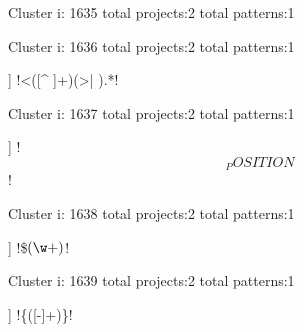 Cluster i: 1635
total projects:2
total patterns:1
\begin{multicols}{1}
\end{multicols}







Cluster i: 1636
total projects:2
total patterns:1
\begin{multicols}{1}
\begin{description}[noitemsep,topsep=0pt]
\item [[2] ] \cverb!<([^ ]+)(>| ).*!
\end{description}
\end{multicols}







Cluster i: 1637
total projects:2
total patterns:1
\begin{multicols}{1}
\begin{description}[noitemsep,topsep=0pt]
\item [[2] ] \cverb!\[_POSITION\]!
\end{description}
\end{multicols}







Cluster i: 1638
total projects:2
total patterns:1
\begin{multicols}{1}
\begin{description}[noitemsep,topsep=0pt]
\item [[2] ] \cverb!\$\((\w+)\)!
\end{description}
\end{multicols}







Cluster i: 1639
total projects:2
total patterns:1
\begin{multicols}{1}
\begin{description}[noitemsep,topsep=0pt]
\item [[2] ] \cverb!\{([-\w]+)\}!
\end{description}
\end{multicols}







